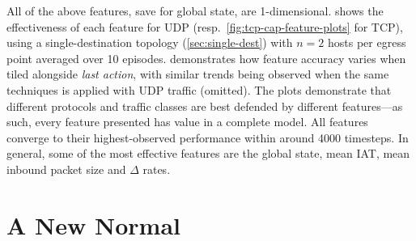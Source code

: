 \documentclass[10pt, times, comsoc]{IEEEtran}
\begin{document}
All of the above features, save for global state, are 1-dimensional.
 shows the effectiveness of each feature for UDP (resp.\ \cref{fig:tcp-cap-feature-plots} for TCP), using a single-destination topology (\cref{sec:single-dest}) with $n=2$ hosts per egress point averaged over 10 episodes.
 demonstrates how feature accuracy varies when tiled alongside \emph{last action}, with similar trends being observed when the same techniques is applied with UDP traffic (omitted).
The plots demonstrate that different protocols and traffic classes are best defended by different features---as such, every feature presented has value in a complete model.
All features converge to their highest-observed performance within around \num{4000} timesteps.
In general, some of the most effective features are the global state, mean IAT, mean inbound packet size and $\Delta$ rates.

\section{A New Normal}\label{sec:a-new-normal}

%
\end{document}
